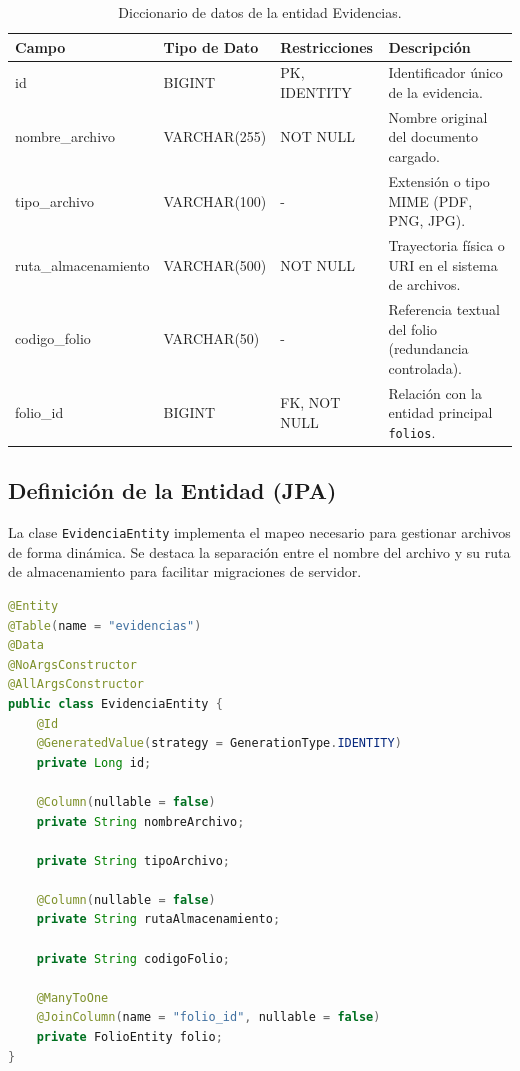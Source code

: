 \begin{table}[H]
\centering
\small
\begin{tabularx}{\textwidth}{|l|l|l|X|}
\hline
\rowcolor{azulESCOM} 
\color{white}\textbf{Campo} & \color{white}\textbf{Tipo de Dato} & \color{white}\textbf{Restricciones} & \color{white}\textbf{Descripci\'on} \\ \hline
id & BIGINT & PK, IDENTITY & Identificador \'unico de la evidencia. \\ \hline
nombre\_archivo & VARCHAR(255) & NOT NULL & Nombre original del documento cargado. \\ \hline
tipo\_archivo & VARCHAR(100) & - & Extensi\'on o tipo MIME (PDF, PNG, JPG). \\ \hline
ruta\_almacenamiento & VARCHAR(500) & NOT NULL & Trayectoria f\'isica o URI en el sistema de archivos. \\ \hline
codigo\_folio & VARCHAR(50) & - & Referencia textual del folio (redundancia controlada). \\ \hline
folio\_id & BIGINT & FK, NOT NULL & Relaci\'on con la entidad principal \texttt{folios}. \\ \hline
\end{tabularx}
\caption{Diccionario de datos de la entidad Evidencias.}
\label{tab:dict_evidencias}
\end{table}

\subsection{Definici\'on de la Entidad (JPA)}
La clase \texttt{EvidenciaEntity} implementa el mapeo necesario para gestionar archivos de forma din\'amica. Se destaca la separaci\'on entre el nombre del archivo y su ruta de almacenamiento para facilitar migraciones de servidor.

\begin{lstlisting}[language=Java, caption={Entidad Java para la gesti\'on de metadatos de archivos de evidencia.}, label={lst:java_evidencia}]
@Entity
@Table(name = "evidencias")
@Data
@NoArgsConstructor
@AllArgsConstructor
public class EvidenciaEntity {
    @Id
    @GeneratedValue(strategy = GenerationType.IDENTITY)
    private Long id;

    @Column(nullable = false)
    private String nombreArchivo;
    
    private String tipoArchivo; 
    
    @Column(nullable = false)
    private String rutaAlmacenamiento; 
    
    private String codigoFolio;

    @ManyToOne
    @JoinColumn(name = "folio_id", nullable = false)
    private FolioEntity folio;
}
\end{lstlisting}


